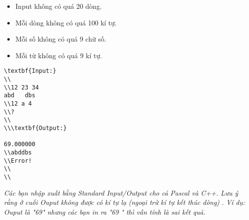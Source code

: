 \begin{itemize}
	\item     Input không có quá 20 dòng.   
	\item     Mỗi dòng không có quá 100 kí tự.   
	\item     Mỗi số không có quá 9 chữ số.   
	\item     Mỗi từ không có quá 9 kí tự.   
\end{itemize}
\begin{verbatim}
\textbf{Input:}
\\
\\12 23 34
abd   dbs
\\12 a 4 
\\?
\\
\\\textbf{Output:}

69.000000
\\abddbs
\\Error! 
\\
\\\end{verbatim}

\emph{    Các bạn nhập xuất bằng Standard Input/Output cho cả Pascal và C++. Lưu ý rằng ở cuối Ouput không được có kí tự lạ   }\emph{    (ngoại trừ kí tự kết thúc dòng)   }\emph{    . Ví dụ: Ouput là "69" nhưng các bạn in ra "69 " thì vẫn tính là sai kết quả.   }